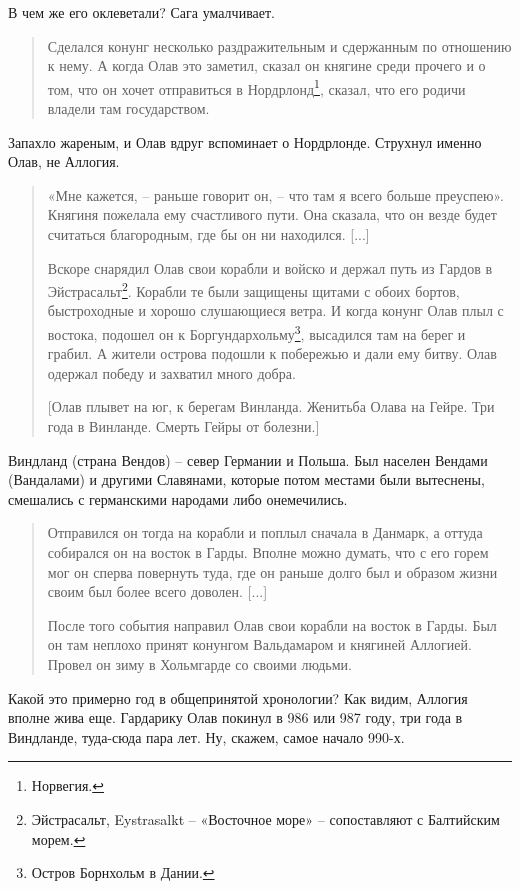 В чем же его оклеветали? Сага умалчивает.

\begin{quotation}
Сделался конунг несколько раздражительным и сдержанным по отношению к нему. А когда Олав это заметил, сказал он княгине среди прочего и о том, что он хочет отправиться в Нордрлонд\footnote{Норвегия.}, сказал, что его родичи владели там государством. 
\end{quotation}

Запахло жареным, и Олав вдруг вспоминает о Нордрлонде. Струхнул именно Олав, не Аллогия.

\begin{quotation}
«Мне кажется, – раньше говорит он, – что там я всего больше преуспею». Княгиня пожелала ему счастливого пути. Она сказала, что он везде будет считаться благородным, где бы он ни находился. [...]

Вскоре снарядил Олав свои корабли и войско и держал путь из Гардов в Эйстрасальт\footnote{Эйстрасальт, Eystrasalkt – «Восточное море» – сопоставляют с Балтийским морем.}. Корабли те были защищены щитами с обоих бортов, быстроходные и хорошо слушающиеся ветра. И когда конунг Олав плыл с востока, подошел он к Боргундархольму\footnote{Остров Борнхольм в Дании.}, высадился там на берег и грабил. А жители острова подошли к побережью и дали ему битву. Олав одержал победу и захватил много добра.

[Олав плывет на юг, к берегам Винланда. Женитьба Олава на Гейре. Три года в Винланде. Смерть Гейры от болезни.]
\end{quotation}

Виндланд (страна Вендов) – север Германии и Польша. Был населен Вендами (Вандалами) и другими Славянами, которые потом местами были вытеснены, смешались с германскими народами либо онемечились.

\begin{quotation}
Отправился он тогда на корабли и поплыл сначала в Данмарк, а оттуда собирался он на восток в Гарды. Вполне можно думать, что с его горем мог он сперва повернуть туда, где он раньше долго был и образом жизни своим был более всего доволен. [...]

После того события направил Олав свои корабли на восток в Гарды. Был он там неплохо принят конунгом Вальдамаром и княгиней Аллогией. Провел он зиму в Хольмгарде со своими людьми.
\end{quotation}

Какой это примерно год в общепринятой хронологии? Как видим, Аллогия вполне жива еще. Гардарику Олав покинул в 986 или 987 году, три года в Виндланде, туда-сюда пара лет. Ну, скажем, самое начало 990-х. 

